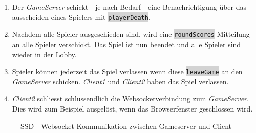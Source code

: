 \documentclass[11pt,ngerman]{article}
\newcommand{\inlinecode}[2]{\colorbox{lightgray}{\lstinline[language=#1]$#2$}}
\begin{document}
\begin{enumerate}
        \item Der \textit{GameServer} schickt - je nach Bedarf - eine Benachrichtigung über das ausscheiden eines Spielers mit \inlinecode{bash}{playerDeath}.
        \item Nachdem alle Spieler ausgeschieden sind, wird eine \inlinecode{bash}{roundScores} Mitteilung an alle Spieler verschickt. Das Spiel ist nun beendet und alle Spieler sind wieder in der Lobby.
        \item Spieler können jederzeit das Spiel verlassen wenn diese \inlinecode{bash}{leaveGame} an den \textit{GameServer} schicken. \textit{Client1} und \textit{Client2} haben das Spiel verlassen.
        \item \textit{Client2} schliesst schlussendlich die Websocketverbindung zum \textit{GameServer}. Dies wird zum Beispiel ausgelöst, wenn das Browserfenster geschlossen wird.
    \end{enumerate}
    \begin{figure}[H]
        \centering
        \caption{SSD - \Gls{Websocket} Kommunikation zwischen Gameserver und Client}
        \label{fig:SSDWS_GS_Client}
    \end{figure}
\end{document}
